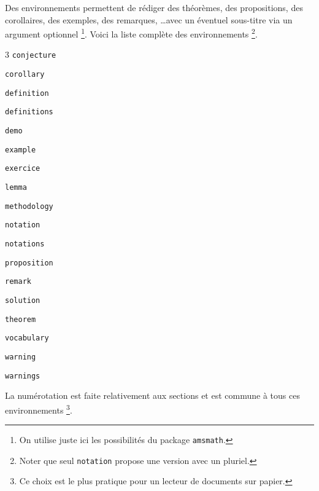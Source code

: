 Des environnements permettent de rédiger des théorèmes, des propositions, des corollaires, des exemples, des remarques, \dots avec un éventuel sous-titre via un argument optionnel
\footnote{
	On utilise juste ici les possibilités du package \texttt{amsmath}.
}. Voici la liste complète des environnements
\footnote{
	Noter que seul \texttt{notation} propose une version avec un pluriel.
}.

\begin{multicols-sep}{3}
	\verb+conjecture+

	\verb+corollary+

	\verb+definition+

	\verb+definitions+

	\verb+demo+

	\verb+example+

	\verb+exercice+
	
	\verb+lemma+

	\verb+methodology+

	\verb+notation+
	
	\verb+notations+

	\verb+proposition+

	\verb+remark+

	\verb+solution+

	\verb+theorem+

	\verb+vocabulary+

	\verb+warning+

	\verb+warnings+
	
\end{multicols-sep}


\medskip


La numérotation est faite relativement aux sections et est commune à tous ces environnements
\footnote{
	Ce choix est le plus pratique pour un lecteur de documents sur papier.
}.
